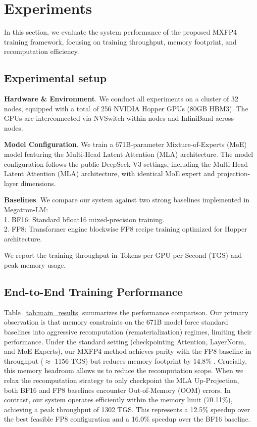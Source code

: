\section{Experiments}
\label{sec:experiments}

In this section, we evaluate the system performance of the proposed MXFP4 training framework, focusing on training throughput, memory footprint, and recomputation efficiency.

\subsection{Experimental setup}
\textbf{Hardware \& Environment}. We conduct all experiments on a cluster of 32 nodes, equipped with a total of 256 NVIDIA Hopper GPUs (80GB HBM3). The GPUs are interconnected via NVSwitch within nodes and InfiniBand across nodes.

\textbf{Model Configuration}. We train a 671B-parameter Mixture-of-Experts (MoE) model featuring the Multi-Head Latent Attention (MLA) architecture. The model configuration follows the public DeepSeek-V3 settings, including the Multi-Head Latent Attention (MLA) architecture, with identical MoE expert and projection-layer dimensions.

\textbf{Baselines}. We compare our system against two strong baselines implemented in Megatron-LM:\\
1. BF16: Standard bfloat16 mixed-precision training.\\
2. FP8: Transformer engine blockwise FP8 recipe  training optimized for Hopper architecture. 

We report the training throughput in Tokens per GPU per Second (TGS) and peak memory usage.
 
\subsection{End-to-End Training Performance}

Table~\ref{tab:main_results} summarizes the performance comparison. Our primary observation is that memory constraints on the 671B model force standard baselines into aggressive recomputation (rematerialization) regimes, limiting their performance. Under the standard setting (checkpointing Attention, LayerNorm, and MoE Experts), our MXFP4 method achieves parity with the FP8 baseline in throughput ($\approx$ 1156 TGS) but reduces memory footprint by 14.8\% . Crucially, this memory headroom allows us to reduce the recomputation scope. When we relax the recomputation strategy to only checkpoint the MLA Up-Projection, both BF16 and FP8 baselines encounter Out-of-Memory (OOM) errors. In contrast, our system operates efficiently within the memory limit (70.11\%), achieving a peak throughput of 1302 TGS. This represents a 12.5\% speedup over the best feasible FP8 configuration and a 16.0\% speedup over the BF16 baseline.  

